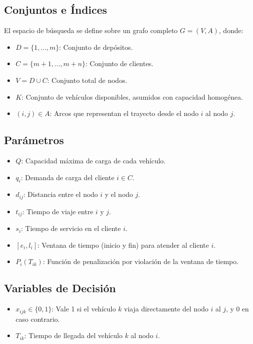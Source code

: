 \documentclass[letter, 10pt]{article}
\begin{document}
\subsection{Conjuntos e \'Indices}

El espacio de b\'usqueda se define sobre un grafo completo $G = (V, A)$, donde:

\begin{itemize}
\item $D = \{1, \dots, m\}$: Conjunto de dep\'ositos.
\item $C = \{m+1, \dots, m+n\}$: Conjunto de clientes.
\item $V = D \cup C$: Conjunto total de nodos.
\item $K$: Conjunto de veh\'iculos disponibles, asumidos con capacidad homog\'enea.
\item $(i, j) \in A$: Arcos que representan el trayecto desde el nodo $i$ al nodo $j$.
\end{itemize}

\subsection{Par\'ametros}

\begin{itemize}
\item $Q$: Capacidad m\'axima de carga de cada veh\'iculo.
\item $q_i$: Demanda de carga del cliente $i \in C$.
\item $d_{ij}$: Distancia entre el nodo $i$ y el nodo $j$.
\item $t_{ij}$: Tiempo de viaje entre $i$ y $j$.
\item $s_i$: Tiempo de servicio en el cliente $i$.
\item $[e_i, l_i]$: Ventana de tiempo (inicio y fin) para atender al cliente $i$.
\item $P_i(T_{ik})$: Funci\'on de penalizaci\'on por violaci\'on de la ventana de tiempo.
\end{itemize}

\subsection{Variables de Decisi\'on}

\begin{itemize}
\item $x_{ijk} \in \{0, 1\}$: Vale 1 si el veh\'iculo $k$ viaja directamente del nodo $i$ al $j$, y 0 en caso contrario.
\item $T_{ik}$: Tiempo de llegada del veh\'iculo $k$ al nodo $i$.
\end{itemize}
\end{document}
